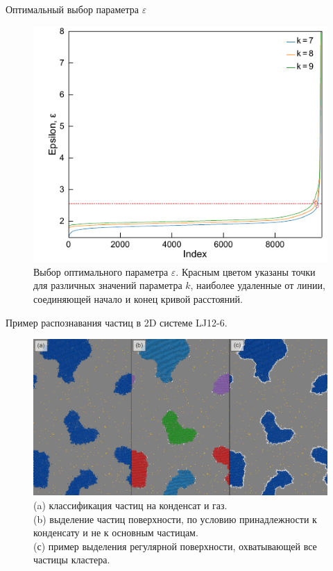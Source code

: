 \documentclass{beamer}
\begin{document}
\begin{frame}{Оптимальный выбор параметра $\varepsilon$}
\footnotesize{


\begin{figure}[!t]
    \centering
    \includegraphics[width=0.7\linewidth]{Figure0.pdf}
    \caption{Выбор оптимального параметра $\varepsilon$. Красным цветом указаны точки для различных значений параметра $k$, наиболее удаленные от линии, соединяющей начало и конец кривой расстояний.}
    \label{epsilon_k}
\end{figure}
}

\end{frame}





\begin{frame}{Пример распознавания частиц в 2D системе LJ12-6.}
\footnotesize{


\begin{figure}[!t]
    \centering
    \includegraphics[width=0.8\linewidth]{PRIMe-FIgure104.pdf}
    \caption{(a) классификация частиц на конденсат и газ. \\
    (b) выделение частиц поверхности, по условию принадлежности к конденсату и не к основным частицам. \\
    (с) пример выделения регулярной поверхности, охватывающей все частицы кластера.}
    \label{DBSCAN-Illustr}
\end{figure}

}

\end{frame}
\end{document}
